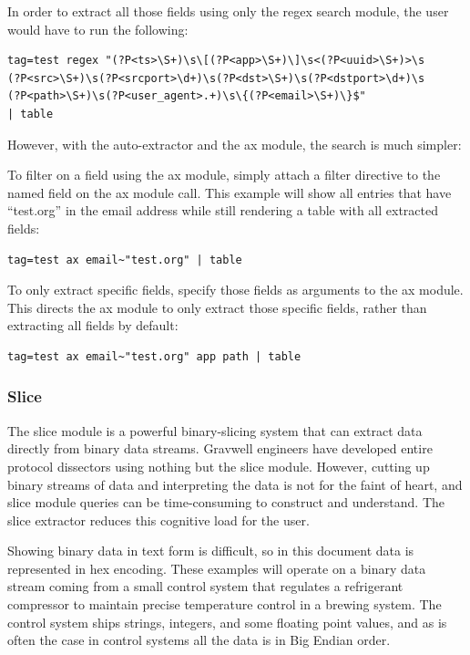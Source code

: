 In order to extract all those fields using only the regex search
module, the user would have to run the following:

\begin{Verbatim}[breaklines=true]
tag=test regex "(?P<ts>\S+)\s\[(?P<app>\S+)\]\s<(?P<uuid>\S+)>\s
(?P<src>\S+)\s(?P<srcport>\d+)\s(?P<dst>\S+)\s(?P<dstport>\d+)\s
(?P<path>\S+)\s(?P<user_agent>.+)\s\{(?P<email>\S+)\}$" 
| table
\end{Verbatim}

However, with the auto-extractor and the ax module, the search is much
simpler:


To filter on a field using the ax module, simply attach a filter
directive to the named field on the ax module call. This example will
show all entries that have ``test.org'' in the email address while still
rendering a table with all extracted fields:

\begin{Verbatim}[breaklines=true]
tag=test ax email~"test.org" | table
\end{Verbatim}

To only extract specific fields, specify those fields as arguments to
the ax module. This directs the ax module to only extract those specific
fields, rather than extracting all fields by default:

\begin{Verbatim}[breaklines=true]
tag=test ax email~"test.org" app path | table
\end{Verbatim}

\subsubsection{Slice}

The slice module is a powerful binary-slicing system that can extract
data directly from binary data streams. Gravwell engineers have
developed entire protocol dissectors using nothing but the slice module.
However, cutting up binary streams of data and interpreting the data is
not for the faint of heart, and slice module queries can be
time-consuming to construct and understand. The slice extractor reduces
this cognitive load for the user.

Showing binary data in text form is difficult, so in this document data
is represented in hex encoding. These examples will operate on a binary
data stream coming from a small control system that regulates a
refrigerant compressor to maintain precise temperature control in a
brewing system. The control system ships strings, integers, and some
floating point values, and as is often the case in control systems all
the data is in Big Endian order.

